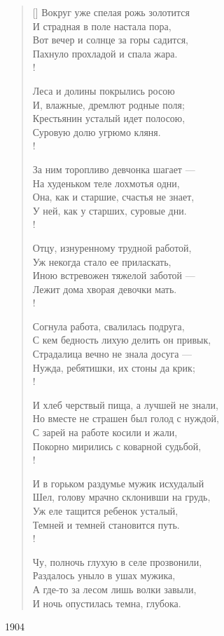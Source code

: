 \settowidth{\versewidth}{Вокруг уже спелая рожь золотится}
\begin{verse}[\versewidth]
Вокруг уже спелая рожь золотится\\
И страдная в поле настала пора,\\
Вот вечер и солнце за горы садится,\\
Пахнуло прохладой и спала жара.\\!

Леса и долины покрылись росою\\
И, влажные, дремлют родные поля;\\
Крестьянин усталый идет полосою,\\
Суровую долю угрюмо кляня.\\!

За ним торопливо девчонка шагает ---\\
На худеньком теле лохмотья одни,\\
Она, как и старшие, счастья не знает,\\
У ней, как у старших, суровые дни.\\!

Отцу, изнуренному трудной работой,\\
Уж некогда стало ее приласкать,\\
Иною встревожен тяжелой заботой ---\\
Лежит дома хворая девочки мать.\\!

Согнула работа, свалилась подруга,\\
С кем бедность лихую делить он привык,\\
Страдалица вечно не знала досуга ---\\
Нужда, ребятишки, их стоны да крик;\\!

И хлеб черствый пища, а лучшей не знали,\\
Но вместе не страшен был голод с нуждой,\\
С зарей на работе косили и жали,\\
Покорно мирились с коварной судьбой,\\!

И в горьком раздумье мужик исхудалый\\
Шел, голову мрачно склонивши на грудь,\\
Уж еле тащится ребенок усталый,\\
Темней и темней становится путь.\\!

Чу, полночь глухую в селе прозвонили,\\
Раздалось уныло в ушах мужика,\\
А где-то за лесом лишь волки завыли,\\
И ночь опустилась темна, глубока.
\end{verse}
1904


